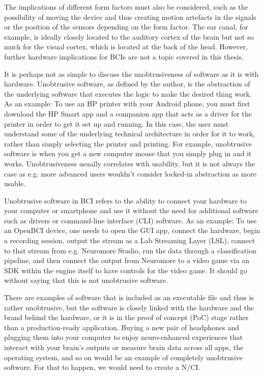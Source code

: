 The implications of different form factors must also be considered, such as the possibility of moving the device and thus creating motion artefacts in the signals or the position of the sensors depending on the form factor. The ear canal, for example, is ideally closely located to the auditory cortex of the brain but not so much for the visual cortex, which is located at the back of the head. However, further hardware implications for BCIs are not a topic covered in this thesis.

It is perhaps not as simple to discuss the unobtrusiveness of software as it is with hardware. Unobtrusive software, as defined by the author, is the abstraction of the underlying software that executes the logic to make the desired thing work. As an example: To use an HP printer with your Android phone, you must first download the HP Smart app and a companion app that acts as a driver for the printer in order to get it set up and running. In this case, the user must understand some of the underlying technical architecture in order for it to work, rather than simply selecting the printer and printing. For example, unobtrusive software is when you get a new computer mouse that you simply plug in and it works. Unobtrusiveness usually correlates with usability, but it is not always the case as e.g. more advanced users wouldn't consider locked-in abstraction as more usable.

Unobtrusive software in BCI refers to the ability to connect your hardware to your computer or smartphone and use it without the need for additional software such as drivers or command-line interface (CLI) software. As an example: To use an OpenBCI device, one needs to open the GUI app, connect the hardware, begin a recording session, output the stream as a Lab Streaming Layer (LSL), connect to that stream from e.g. Neuromore Studio, run the data through a classification pipeline, and then connect the output from Neuromore to a video game via an SDK within the engine itself to have controls for the video game. It should go without saying that this is not unobtrusive software.

There are examples of software that is included as an executable file and thus is rather unobtrusive, but the software is closely linked with the hardware and the brand behind the hardware, or it is in the proof of concept (PoC) stage rather than a production-ready application. Buying a new pair of headphones and plugging them into your computer to enjoy neuro-enhanced experiences that interact with your brain's outputs or measure brain data across all apps, the operating system, and so on would be an example of completely unobtrusive software. For that to happen, we would need to create a N/CI.

